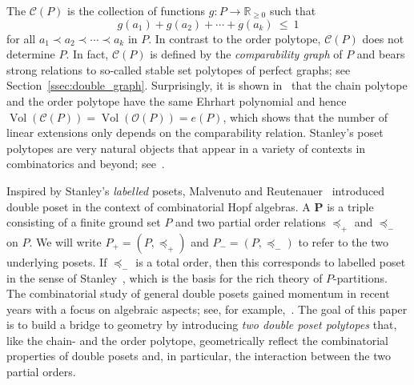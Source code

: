 \documentclass[11pt]{amsart}
\theoremstyle{definition}
\begin{document}
The {\textbf{\color{black}{chain polytope}}} ${\mathcal{C}({P})}$ is the
collection of functions $g : {P} \rightarrow {\mathbb{R}}_{\ge 0}$ such that 
\begin{equation}\label{eqn:chain}
    g(a_1) + g(a_2) + \cdots + g(a_k) \ \le \ 1
\end{equation}
for all {\textbf{\color{black}{chains}}} $a_1 \prec a_2 \prec \cdots \prec a_k$ in ${P}$. In
contrast to the order polytope, ${\mathcal{C}({P})}$ does not determine ${P}$. In fact,
${\mathcal{C}({P})}$ is defined by the \emph{comparability graph} of ${P}$ and bears
strong relations to so-called stable set polytopes of perfect graphs; see
Section~\ref{ssec:double_graph}. Surprisingly, it is shown in~\cite{TwoPoset}
that the chain polytope and the order polytope have the same Ehrhart
polynomial and hence $\operatorname{Vol}({\mathcal{C}({P})}) = \operatorname{Vol}({\mathcal{O}({P})}) = e({P})$, which
shows that the number of linear extensions only depends on the comparability
relation.
Stanley's poset
polytopes are very natural objects that appear in a variety of contexts in
combinatorics and beyond; see~\cite{ABS, js12, Sottile, Fourier}.

Inspired by Stanley's \emph{labelled} posets, Malvenuto and
Reutenauer~\cite{MR} introduced double poset in the context of
combinatorial Hopf algebras.  A {\textbf{\color{black}{double poset}}} ${\mathbf{P}}$ is a triple
consisting of a finite ground set ${P}$ and two partial order relations
$\preceq_+$ and $\preceq_-$ on ${P}$. We will write ${P}_+ = ({P},\preceq_+)$ and
${P}_- = ({P},\preceq_-)$ to refer to the two underlying posets. If $\preceq_-$
is a total order, then this corresponds to labelled poset in the sense of
Stanley~\cite{Stanley72}, which is the basis for the rich theory of
${P}$-partitions. The combinatorial study of general double posets gained 
momentum in recent years with a focus on algebraic aspects; see, for
example,~\cite{Foissy1,Foissy2}. The goal of this paper is to build a bridge to
geometry by introducing \emph{two double poset polytopes} that, like the
chain- and the order polytope, geometrically reflect the combinatorial
properties of double posets and, in particular, the interaction between the
two partial orders.  
\end{document}
